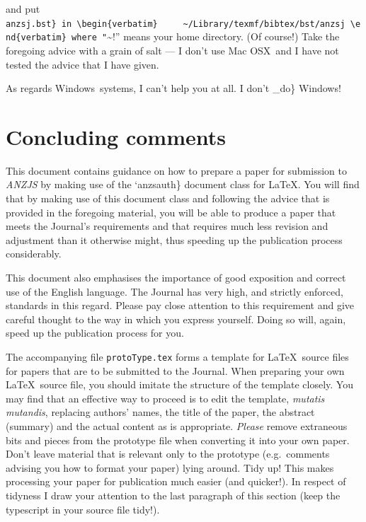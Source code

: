 \documentclass[
  times,
  doublespace]{anzsauth}
\begin{document}
and put
\texttt{anzsj.bst\}\ in\ \textbackslash{}begin\{verbatim\}\ \ \ \ \ \textasciitilde{}/Library/texmf/bibtex/bst/anzsj\ \textbackslash{}end\{verbatim\}\ where\ "}\textasciitilde!''
means your home directory. (Of course!) Take the foregoing advice with a
grain of salt --- I don't use Mac OSX\texttrademark~and I have not
tested the advice that I have given.

As regards Windows\texttrademark~systems, I can't help you at all. I
don't \_do\} Windows\texttrademark!

\section{Concluding comments}\label{sec:concComm}

This document contains guidance on how to prepare a paper for submission
to \emph{ANZJS} by making use of the `anzsauth\} document class for
\LaTeX. You will find that by making use of this document class and
following the advice that is provided in the foregoing material, you
will be able to produce a paper that meets the Journal's requirements
and that requires much less revision and adjustment than it otherwise
might, thus speeding up the publication process considerably.

This document also emphasises the importance of good exposition and
correct use of the English language. The Journal has very high, and
strictly enforced, standards in this regard. Please pay close attention
to this requirement and give careful thought to the way in which you
express yourself. Doing so will, again, speed up the publication process
for you.

The accompanying file \texttt{protoType.tex} forms a template for
\LaTeX~source files for papers that are to be submitted to the Journal.
When preparing your own \LaTeX~source file, you should imitate the
structure of the template closely. You may find that an effective way to
proceed is to edit the template, \emph{mutatis mutandis}, replacing
authors' names, the title of the paper, the abstract (summary) and the
actual content as is appropriate. \emph{Please} remove extraneous bits
and pieces from the prototype file when converting it into your own
paper. Don't leave material that is relevant only to the prototype
(e.g.~comments advising you how to format your paper) lying around. Tidy
up! This makes processing your paper for publication much easier (and
quicker!). In respect of tidyness I draw your attention to the last
paragraph of this section (keep the typescript in your source file
tidy!).
\end{document}
